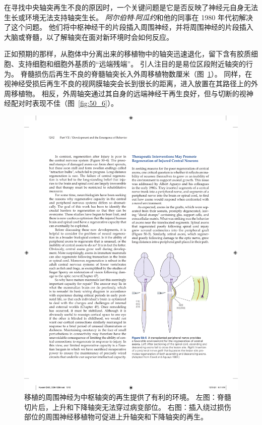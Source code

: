 在寻找中央轴突再生不良的原因时，一个关键问题是它是否反映了神经元自身无法生长或环境无法支持轴突生长。
\textit{阿尔伯特$\cdot$阿瓜约}和他的同事在 1980 年代初解决了这个问题。
他们将中枢神经干的片段插入周围神经，并将周围神经的片段插入大脑或脊髓，以了解轴突在面对新环境时会如何反应。


正如预期的那样，从胞体中分离出来的移植物中的轴突迅速退化，留下含有胶质细胞、支持细胞和细胞外基质的“远端残端”。
引人注目的是易位区段附近轴突的行为。
脊髓损伤后再生不良的脊髓轴突长入外周移植物数厘米（图~\ref{fig:50_5}）。
同样，在视神经受损后再生不良的视网膜轴突会长到很长的距离，进入放置在其路径上的外周移植物。
相反，外周轴突通过其自身的远端神经干再生良好，但与切断的视神经配对时表现不佳（图~\ref{fig:50_6}）。


\begin{figure}[htbp]
	\centering
	\includegraphics[width=0.6\linewidth]{chap50/fig_50_5}
	\caption{移植的周围神经为中枢轴突的再生提供了有利的环境。
		左图：脊髓切片后，上升和下降轴突无法穿过病变部位。
		右图：插入绕过损伤部位的周围神经移植物可促进上升轴突和下降轴突的再生\cite{david1981axonal}。}
	\label{fig:50_5}
\end{figure}


